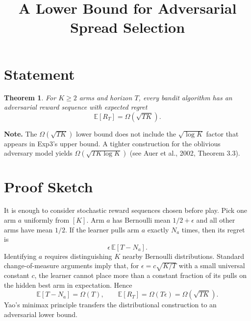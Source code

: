\documentclass[11pt]{article}
\title{A Lower Bound for Adversarial Spread Selection}
\author{}
\date{}
\newtheorem{theorem}{Theorem}
\begin{document}
\maketitle

\section{Statement}
\begin{theorem}
For $K\ge 2$ arms and horizon $T$, every bandit algorithm has an adversarial
reward sequence with expected regret
\[
\mathbb{E}[R_T] = \Omega(\sqrt{TK}).
\]
\end{theorem}

\noindent\textbf{Note.} The $\Omega(\sqrt{TK})$ lower bound does not include the
$\sqrt{\log K}$ factor that appears in Exp3's upper bound. A tighter
construction for the oblivious adversary model yields
$\Omega(\sqrt{TK\log K})$ (see Auer et al., 2002, Theorem 3.3).

\section{Proof Sketch}
It is enough to consider stochastic reward sequences chosen before play. Pick
one arm $a$ uniformly from $[K]$. Arm $a$ has Bernoulli mean $1/2+\epsilon$ and
all other arms have mean $1/2$. If the learner pulls arm $a$ exactly $N_a$
times, then its regret is
\[
\epsilon\,\mathbb{E}[T-N_a].
\]
Identifying $a$ requires distinguishing $K$ nearby Bernoulli distributions.
Standard change-of-measure arguments imply that, for
$\epsilon = c\sqrt{K/T}$ with a small universal constant $c$, the learner cannot
place more than a constant fraction of its pulls on the hidden best arm in
expectation. Hence
\[
\mathbb{E}[T-N_a] = \Omega(T),
\qquad
\mathbb{E}[R_T] = \Omega(T\epsilon)=\Omega(\sqrt{TK}).
\]
Yao's minimax principle transfers the distributional construction to an
adversarial lower bound.
\end{document}
